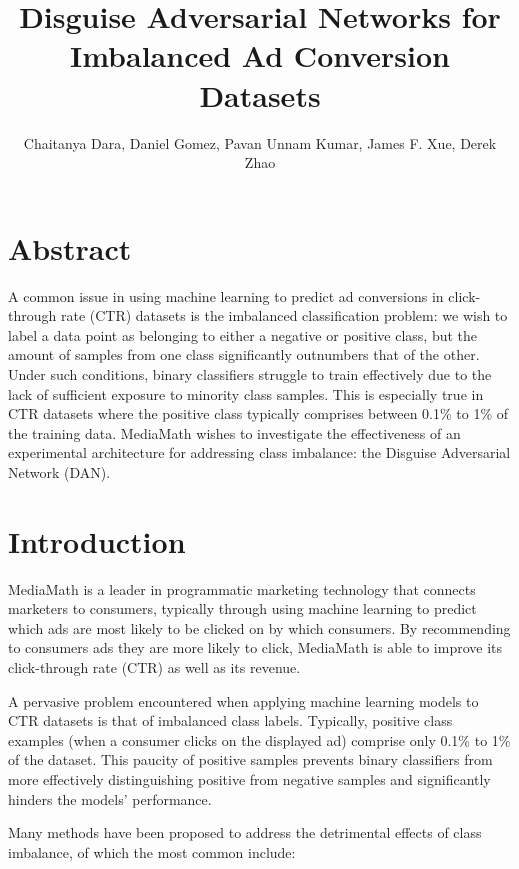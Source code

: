 \documentclass{proc}
\begin{document}
\title{Disguise Adversarial Networks for Imbalanced Ad Conversion Datasets}

\author{Chaitanya Dara, Daniel Gomez, Pavan Unnam Kumar, James F. Xue, Derek Zhao}

\maketitle

\section{Abstract}

A common issue in using machine learning to predict ad conversions in click-through rate (CTR) datasets is the imbalanced classification problem: we wish to label a data point as belonging to either a negative or positive class, but the amount of samples from one class significantly outnumbers that of the other. Under such conditions, binary classifiers struggle to train effectively due to the lack of sufficient exposure to minority class samples. This is especially true in CTR datasets where the positive class typically comprises between 0.1\% to 1\% of the training data. MediaMath wishes to investigate the effectiveness of an experimental architecture for addressing class imbalance: the Disguise Adversarial Network (DAN).

\section{Introduction}

MediaMath is a leader in programmatic marketing technology that connects marketers to consumers, typically through using machine learning to predict which ads are most likely to be clicked on by which consumers. By recommending to consumers ads they are more likely to click, MediaMath is able to improve its click-through rate (CTR) as well as its revenue.

A pervasive problem encountered when applying machine learning models to CTR datasets is that of imbalanced class labels. Typically, positive class examples (when a consumer clicks on the displayed ad) comprise only 0.1\% to 1\% of the dataset. This paucity of positive samples prevents binary classifiers from more effectively distinguishing positive from negative samples and significantly hinders the models' performance.

Many methods have been proposed to address the detrimental effects of class imbalance, of which the most common include:
\end{document}
